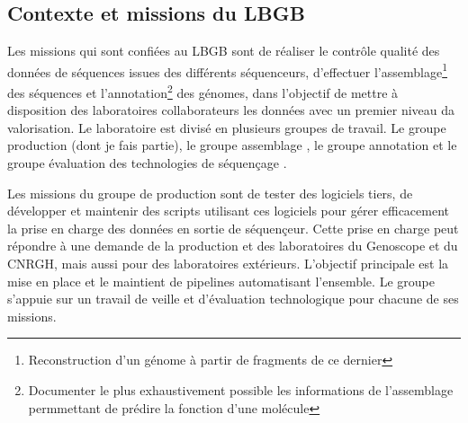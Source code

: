 \subsection{Contexte et missions du LBGB}
Les missions qui sont confiées au LBGB sont de réaliser le contrôle qualité des données de séquences issues des différents séquenceurs, d'effectuer l'assemblage\footnote{Reconstruction d'un génome à partir de fragments de ce dernier} des séquences et l'annotation\footnote{Documenter le plus exhaustivement possible les informations de l'assemblage permmettant de prédire la fonction d'une molécule} des génomes, dans l'objectif de mettre à disposition des laboratoires collaborateurs les données avec un premier niveau da valorisation. Le laboratoire est divisé en plusieurs groupes de travail. Le groupe \og production \fg{} (dont je fais partie), le groupe \og assemblage \fg{}, le groupe \og annotation \fg{} et le groupe \og évaluation des technologies de séquençage \fg{}.

Les missions du groupe de \og production \fg{} sont de tester des logiciels tiers, de développer et maintenir des scripts utilisant ces logiciels pour gérer efficacement la prise en charge des données en sortie de séquençeur. Cette prise en charge peut répondre à une demande de la production et des laboratoires du Genoscope et du CNRGH, mais aussi pour des laboratoires extérieurs. L'objectif principale est la mise en place et le maintient de pipelines automatisant l'ensemble. Le groupe s'appuie sur un travail de veille et d'évaluation technologique pour chacune de ses missions. 


